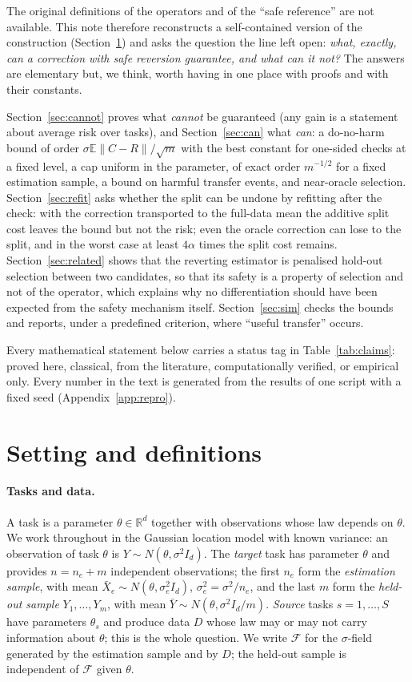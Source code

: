 \documentclass[10pt,a4paper]{article}
\theoremstyle{plain}
\theoremstyle{definition}
\theoremstyle{remark}
\newcommand{\R}{\mathbb{R}}
\newcommand{\E}{\mathbb{E}}
\newcommand{\Ybar}{\bar{Y}}
\newcommand{\norm}[1]{\lVert #1\rVert}
\begin{document}
The original definitions of the operators and of the ``safe reference'' are not available. This note therefore reconstructs a self-contained version of the construction (Section~\ref{sec:setting}) and asks the question the line left open: \emph{what, exactly, can a correction with safe reversion guarantee, and what can it not?} The answers are elementary but, we think, worth having in one place with proofs and with their constants.

Section~\ref{sec:cannot} proves what \emph{cannot} be guaranteed (any gain is a statement about average risk over tasks), and Section~\ref{sec:can} what \emph{can}: a do-no-harm bound of order $\sigma\E\norm{C-R}/\sqrt m$ with the best constant for one-sided checks at a fixed level, a cap uniform in the parameter, of exact order $m^{-1/2}$ for a fixed estimation sample, a bound on harmful transfer events, and near-oracle selection. Section~\ref{sec:refit} asks whether the split can be undone by refitting after the check: with the correction transported to the full-data mean the additive split cost leaves the bound but not the risk; even the oracle correction can lose to the split, and in the worst case at least $4\alpha$ times the split cost remains. Section~\ref{sec:related} shows that the reverting estimator is penalised hold-out selection between two candidates, so that its safety is a property of selection and not of the operator, which explains why no differentiation should have been expected from the safety mechanism itself. Section~\ref{sec:sim} checks the bounds and reports, under a predefined criterion, where ``useful transfer'' occurs.

Every mathematical statement below carries a status tag in Table~\ref{tab:claims}: proved here, classical, from the literature, computationally verified, or empirical only. Every number in the text is generated from the results of one script with a fixed seed (Appendix~\ref{app:repro}).

\section{Setting and definitions}\label{sec:setting}

\paragraph{Tasks and data.}
A task is a parameter $\theta\in\R^d$ together with observations whose law depends on $\theta$. We work throughout in the Gaussian location model with known variance: an observation of task $\theta$ is $Y\sim N(\theta,\sigma^2 I_d)$. The \emph{target} task has parameter $\theta$ and provides $n=n_e+m$ independent observations; the first $n_e$ form the \emph{estimation sample}, with mean $\bar X_e\sim N(\theta,\sigma_e^2 I_d)$, $\sigma_e^2=\sigma^2/n_e$, and the last $m$ form the \emph{held-out sample} $Y_1,\dots,Y_m$, with mean $\Ybar\sim N(\theta,\sigma^2 I_d/m)$. \emph{Source} tasks $s=1,\dots,S$ have parameters $\theta_s$ and produce data $D$ whose law may or may not carry information about $\theta$; this is the whole question. We write $\mathcal F$ for the $\sigma$-field generated by the estimation sample and by $D$; the held-out sample is independent of $\mathcal F$ given $\theta$.
\end{document}
